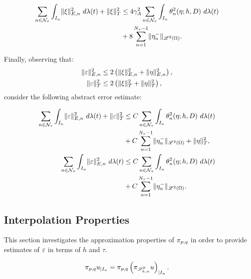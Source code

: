 \begin{lemma}
    \begin{align}
        \sum_{n \in \mathcal{N}_{\tau}} \int_{I_n} \lVert \xi \rVert_{E, n}^2 ~ d \lambda(t) + \lVert \xi \rVert_T^2 &\leq 4 \gamma_{A}^2 \sum_{n \in \mathcal{N}_{\tau}} \int_{I_n} \theta_n^2(\eta; h, D) ~ d \lambda(t) \\
        &+ 8 \sum_{n = 1}^{N_{\tau} - 1} \lVert \eta_n^- \rVert_{\mathscr{L}^{2}(\Omega)}. \notag
    \end{align}
\end{lemma}

Finally, observing that:
\begin{align}
    \lVert \varepsilon \rVert_{E, n}^2 &\leq 2 \left( \lVert \xi \rVert_{E, n}^2 + \lVert \eta \rVert_{E, n}^2 \right), \\
    \lVert \varepsilon \rVert_T^2 &\leq 2 \left( \lVert \xi \rVert_T^2 + \lVert \eta \rVert_T^2 \right),
\end{align}
consider the following abstract error estimate:
\begin{lemma}
    \begin{align}
        \sum_{n \in \mathcal{N}_{\tau}} \int_{I_n} \lVert \varepsilon \rVert_{E, n}^2 ~ d \lambda(t) + \lVert \varepsilon \rVert_T^2 &\leq C \sum_{n \in \mathcal{N}_{\tau}} \int_{I_n} \theta_n^2(\eta; h, D) ~ d \lambda(t) \\
        &+ C \sum_{n = 1}^{N_{\tau} - 1} \lVert \eta_n^- \rVert_{\mathscr{L}^{2}(\Omega)} + \lVert \eta \rVert_T^2, \notag \\ 
        \sum_{n \in \mathcal{N}_{\tau}} \int_{I_n} \lVert \varepsilon \rVert_{E, n}^2 ~ d \lambda(t) &\leq C \sum_{n \in \mathcal{N}_{\tau}} \int_{I_n} \theta_n^2(\eta; h, D) ~ d \lambda(t) \\
        &+ C \sum_{n = 1}^{N_{\tau} - 1} \lVert \eta_n^- \rVert_{\mathscr{L}^{2}(\Omega)}. \notag
    \end{align}
\end{lemma}

\newpage
\subsection{Interpolation Properties}

This section investigates the approximation properties of $\pi_{p, q}$ in order to provide estimates of $\varepsilon$ in terms of $h$ and $\tau$.

\begin{lemma}
    \begin{gather}
        \pi_{p, q} u_{\mid I_n} = \pi_{p, q} \left( \pi_{\mathscr{S}^p_{h, n}} u \right)_{\mid I_n}.
    \end{gather}
\end{lemma}

